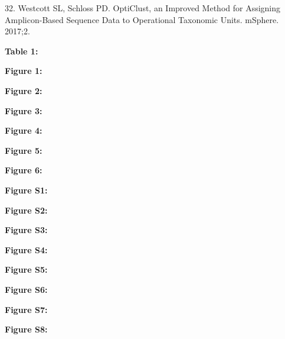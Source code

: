 \documentclass[12pt,]{article}
\begin{document}
\hypertarget{ref-westcott_opticlust_2017}{}
32. Westcott SL, Schloss PD. OptiClust, an Improved Method for Assigning
Amplicon-Based Sequence Data to Operational Taxonomic Units. mSphere.
2017;2.

\newpage

\textbf{Table 1:}

\newpage

\textbf{Figure 1: }

\textbf{Figure 2: }

\textbf{Figure 3: }

\textbf{Figure 4: }

\textbf{Figure 5: }

\textbf{Figure 6: }

\newpage

\textbf{Figure S1: }

\textbf{Figure S2: }

\textbf{Figure S3: }

\textbf{Figure S4: }

\textbf{Figure S5: }

\textbf{Figure S6: }

\textbf{Figure S7: }

\textbf{Figure S8: }

\newpage
\end{document}
